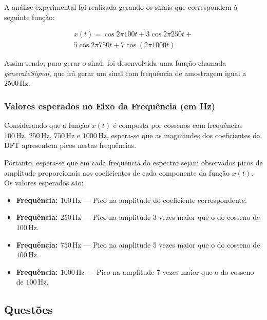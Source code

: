A análise experimental foi realizada gerando os sinais que correspondem à seguinte função:

\begin{align}
    x(t) = \cos{2\pi 100 t} + 3 \cos{2\pi 250 t} + \\
    5 \cos{2\pi 750 t} + 7 \cos(2\pi 1000 t)    
\end{align}

Assim sendo, para gerar o sinal, foi desenvolvida uma função chamada \textit{generateSignal}, que irá gerar um sinal com frequência de amostragem igual a $2500\, \text{Hz}$.


\subsubsection*{Valores esperados no Eixo da Frequência (em Hz)}

Considerando que a função $x(t)$ é composta por cossenos com frequências $100 \, \text{Hz}$, $250 \, \text{Hz}$, $750 \, \text{Hz}$ e $1000 \, \text{Hz}$, espera-se que as magnitudes dos coeficientes da DFT apresentem picos nestas frequências.

Portanto, espera-se que em cada frequência do espectro sejam observados picos de amplitude proporcionais aos coeficientes de cada componente da função $x(t)$. Os valores esperados são:

\begin{itemize}
    \item \textbf{Frequência: $100 \, \text{Hz}$} — Pico na amplitude do coeficiente correspondente.
    \item \textbf{Frequência: $250 \, \text{Hz}$} — Pico na amplitude 3 vezes maior que o do cosseno de $100 \, \text{Hz}$.
    \item \textbf{Frequência: $750 \, \text{Hz}$} — Pico na amplitude 5 vezes maior que o do cosseno de $100 \, \text{Hz}$.
    \item \textbf{Frequência: $1000 \, \text{Hz}$} — Pico na amplitude 7 vezes maior que o do cosseno de $100 \, \text{Hz}$.
\end{itemize}

\subsection{Questões}

